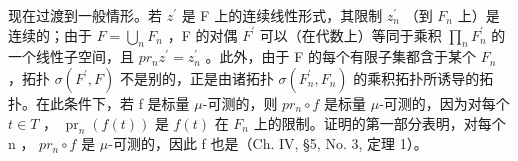 现在过渡到一般情形。若 \(z^{\prime}\) 是 F 上的连续线性形式，其限制 \(z_{n}^{\prime}\) （到 \(F_{n}\) 上）是连续的；由于 \(F = \bigcup_{n} F_{n}\) ，F 的对偶 \(F^{\prime}\) 可以（在代数上）等同于乘积 \(\prod_{n} F_{n}^{\prime}\) 的一个线性子空间，且 \(pr_{n}z^{\prime} = z_{n}^{\prime}\) 。此外，由于 F 的每个有限子集都含于某个 \(F_{n}\) ，拓扑 \(\sigma(F^{\prime}, F)\) 不是别的，正是由诸拓扑 \(\sigma(F_{n}^{\prime}, F_{n})\) 的乘积拓扑所诱导的拓扑。在此条件下，若 f 是标量 \(\mu\)-可测的，则 \(pr_{n} \circ f\) 是标量 \(\mu\)-可测的，因为对每个 \(t \in T\) ， \(\operatorname{pr}_{n}(f(t))\) 是 \(f(t)\) 在 \(F_{n}\) 上的限制。证明的第一部分表明，对每个 n ， \(pr_{n} \circ f\) 是 \(\mu\)-可测的，因此 f 也是（Ch. IV, §5, No. 3, 定理 1）。

